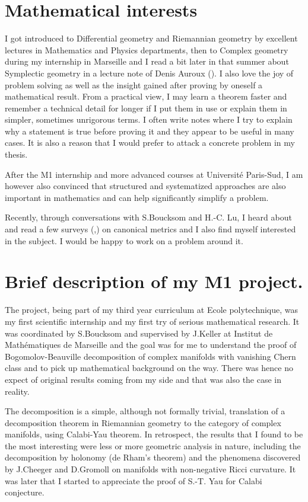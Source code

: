 \documentclass[11pt]{article}
\begin{document}
\section{Mathematical interests}
\label{sec:orgdd7ef3f}

I got introduced to Differential geometry and Riemannian geometry by excellent lectures in Mathematics and Physics departments, then to Complex geometry during my internship in Marseille and I read a bit
later in that summer about Symplectic geometry in a lecture note of Denis Auroux (\cite{auroux09:lect}). I also
love the joy of problem solving as well as the insight gained after proving by oneself a
mathematical result. From a practical view, I may learn a theorem faster and remember a
technical detail for longer if I put them in use or explain them in simpler, sometimes
unrigorous terms. I often write notes where I try to explain why a statement is true before
proving it and they appear to be useful in many cases. It is also a reason that I would
prefer to attack a concrete problem in my thesis.

After the M1 internship and more advanced courses at Université Paris-Sud, I am however
also convinced that structured and systematized approaches are also important in
mathematics and can help significantly simplify a problem.

Recently, through conversations with S.Boucksom and H.-C. Lu, I heard about and read a
few surveys (\cite{szekelyhidi17:_kahler_einst},\cite{angella17:_kahler_einst}) on canonical metrics and I also find myself interested in the subject. I would be happy
to work on a problem around it.

\section{Brief description of my M1 project.}
\label{sec:orgd060841}
The project, being part of my third year curriculum at Ecole polytechnique, was my first
scientific internship and my first try of serious mathematical research. It was
coordinated by S.Boucksom and supervised by J.Keller at Institut de Mathématiques de
Marseille and the goal was for me to understand the proof of Bogomolov-Beauville
decomposition of complex manifolds with vanishing Chern class and to pick up mathematical
background on the way. There was hence no expect of original results coming from my side
and that was also the case in reality.

The decomposition is a simple, although not formally trivial, translation of a decomposition theorem in Riemannian
geometry to the category of complex manifolds, using Calabi-Yau theorem. In retrospect,
the results that I found to be the most interesting were less or more geometric analysis in nature, including the
decomposition by holonomy (de Rham's theorem) and the phenomena discovered by J.Cheeger and D.Gromoll on
manifolds with non-negative Ricci curvature. It was later that I started to appreciate the
proof of S.-T. Yau for Calabi conjecture. 
\end{document}
